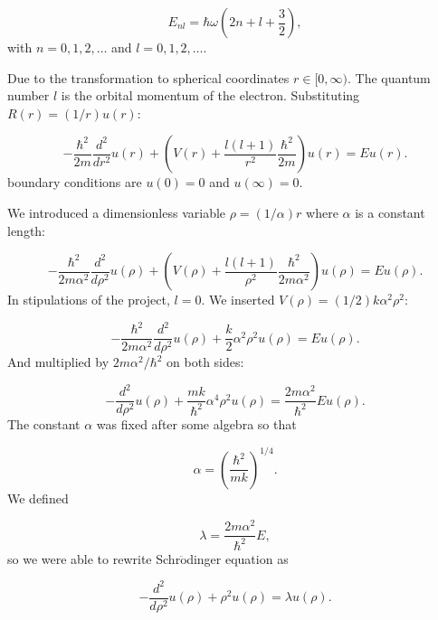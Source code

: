 \documentclass[%
reprint,
superscriptaddress,
showpacs,
nofootinbib,
bibnotes,amsmath,amssymb,aps,
prc, 
]{revtex4-1}
\begin{document}
\begin{equation*}
E_{nl}=  \hbar \omega \left(2n+l+\frac{3}{2}\right),
\end{equation*}
with $n=0,1,2,\dots$ and $l=0,1,2,\dots$.

Due to the transformation to spherical coordinates
$r\in [0,\infty)$.  
The quantum number
$l$ is the orbital momentum of the electron.  
% 
Substituting $R(r) = (1/r) u(r)$:
% 

\begin{equation*}
-\frac{\hbar^2}{2 m} \frac{d^2}{dr^2} u(r) 
+ \left ( V(r) + \frac{l (l + 1)}{r^2}\frac{\hbar^2}{2 m}
\right ) u(r)  = E u(r) .
\end{equation*}
% 
boundary conditions are $u(0)=0$ and $u(\infty)=0$.

We introduced a dimensionless variable $\rho = (1/\alpha) r$
where $\alpha$ is a constant length:
% 

\begin{equation*}
-\frac{\hbar^2}{2 m \alpha^2} \frac{d^2}{d\rho^2} u(\rho) 
+ \left ( V(\rho) + \frac{l (l + 1)}{\rho^2}
\frac{\hbar^2}{2 m\alpha^2} \right ) u(\rho)  = E u(\rho) .
\end{equation*}
% 
In stipulations of the project, $l=0$.
We inserted $V(\rho) = (1/2) k \alpha^2\rho^2$:

\begin{equation*}
-\frac{\hbar^2}{2 m \alpha^2} \frac{d^2}{d\rho^2} u(\rho) 
+ \frac{k}{2} \alpha^2\rho^2u(\rho)  = E u(\rho) .
\end{equation*}
And multiplied by $2m\alpha^2/\hbar^2$ on both sides:

\begin{equation*}
-\frac{d^2}{d\rho^2} u(\rho) 
+ \frac{mk}{\hbar^2} \alpha^4\rho^2u(\rho)  = \frac{2m\alpha^2}{\hbar^2}E u(\rho) .
\end{equation*}
The constant $\alpha$ was fixed after some algebra
so that


\begin{equation*}
\alpha = \left(\frac{\hbar^2}{mk}\right)^{1/4}.
\end{equation*}
We defined

\begin{equation*}
\lambda = \frac{2m\alpha^2}{\hbar^2}E,
\end{equation*}
so we were able to rewrite Schr$\ddot{\textrm{o}}$dinger equation as

\begin{equation*}
-\frac{d^2}{d\rho^2} u(\rho) + \rho^2u(\rho)  = \lambda u(\rho) .
\end{equation*}
\end{document}
